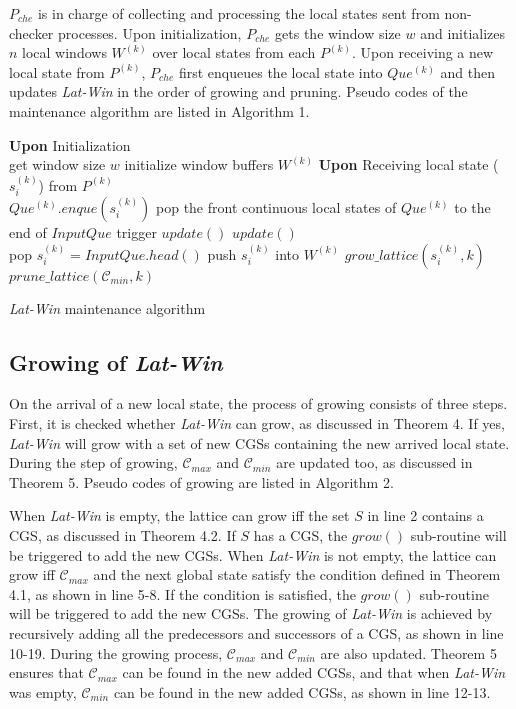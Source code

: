 \documentclass[12pt,journal,letterpaper,compsoc]{IEEEtran}
\begin{document}
$P_{che}$ is in charge of collecting and processing the local states sent from non-checker processes. Upon initialization, $P_{che}$ gets the window size $w$ and initializes $n$ local windows $W^{(k)}$ over local states from each $P^{(k)}$. Upon receiving a new local state from $P^{(k)}$, $P_{che}$ first enqueues the local state into $Que^{(k)}$ and then updates {\it Lat-Win} in the order of growing and pruning. Pseudo codes of the maintenance algorithm are listed in Algorithm 1.

\begin{algorithm}[htbp]
\SetAlgoVlined
\textbf{Upon} Initialization\\
    get window size $w$\;
    initialize window buffers $W^{(k)}$\;
\textbf{Upon} Receiving local state ($s^{(k)}_i$) from $P^{(k)}$\\
    $Que^{(k)}.enque(s^{(k)}_i)$\;
    {
        pop the front continuous local states of $Que^{(k)}$ to the end of $InputQue$\;
        trigger $update()$\;
    }
    \vspace{0.3cm}
    $update()$\\
    {
        pop $s^{(k)}_i = InputQue.head()$\;
        push $s^{(k)}_i$ into $W^{(k)}$ 
        $grow\_lattice(s^{(k)}_i, k)$ 
        $prune\_lattice(\mathcal{C}_{min},k)$ 
    }
\caption{{\it Lat-Win} maintenance algorithm\label{A:Checker-Process}}
\end{algorithm}

\subsection{Growing of {\it Lat-Win}}

On the arrival of a new local state, the process of growing consists of three steps. First, it is checked whether {\it Lat-Win} can grow, as discussed in Theorem 4. If yes, {\it Lat-Win} will grow with a set of new CGSs containing the new arrived local state. During the step of growing, $\mathcal{C}_{max}$ and $\mathcal{C}_{min}$ are updated too, as discussed in Theorem 5. Pseudo codes of growing are listed in Algorithm 2.

When {\it Lat-Win} is empty, the lattice can grow iff the set $S$ in line 2 contains a CGS, as discussed in Theorem 4.2. If $S$ has a CGS, the $grow()$ sub-routine will be triggered to add the new CGSs. When {\it Lat-Win} is not empty, the lattice can grow iff $\mathcal{C}_{max}$ and the next global state satisfy the condition defined in Theorem 4.1, as shown in line 5-8. If the condition is satisfied, the $grow()$ sub-routine will be triggered to add the new CGSs. The growing of {\it Lat-Win} is achieved by recursively adding all the predecessors and successors of a CGS, as shown in line 10-19. During the growing process, $\mathcal{C}_{max}$ and $\mathcal{C}_{min}$ are also updated. Theorem 5 ensures that $\mathcal{C}_{max}$ can be found in the new added CGSs, and that when {\it Lat-Win} was empty, $\mathcal{C}_{min}$ can be found in the new added CGSs, as shown in line 12-13.
\end{document}
